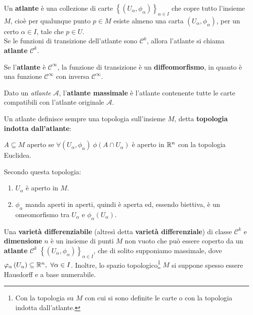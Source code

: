 \begin{define}[Atlante]
	Un \textbf{atlante} è una collezione di carte $\left\{\left(U_\alpha,\phi_\alpha\right)\right\}_{\alpha\in I}$ che copre tutto l'insieme $M$, cioè per qualunque punto $p\in M$ esiste almeno una carta $\left(U_\alpha,\phi_\alpha\right)$, per un certo $\alpha\in I$, tale che $p\in U$.\\
	Se le funzioni di transizione dell'atlante sono $\mathcal{C}^k$, allora l'atlante si chiama \textbf{atlante} $\mathcal{C}^k$.
\end{define}
Se l'\textbf{atlante} è $\mathcal{C}^\infty$, la funzione di transizione è un \textbf{diffeomorfismo}, in quanto è una funzione $\mathcal{C}^{\infty}$ con inversa $\mathcal{C}^{\infty}$.
\begin{define}
	Dato un \textit{atlante} $\mathcal{A}$, l'\textbf{atlante massimale} è l'atlante contenente tutte le carte compatibili con l'atlante originale $\mathcal{A}$.
\end{define}
\begin{define}
	Un atlante definisce sempre una topologia sull'insieme $M$, detta \textbf{topologia indotta dall'atlante}:
	\begin{center}
		$A\subseteq M$ aperto se $\forall \left(U_\alpha, \phi_\alpha\right)\ \phi\left(A\cap U_\alpha\right)$ è aperto in $\mathbb{R}^n$ con la topologia Euclidea.
	\end{center}
\end{define}
Secondo questa topologia:
\begin{enumerate}
	\item $U_\alpha$ è aperto in $M$.
	\item $\phi_\alpha$ manda aperti in aperti, quindi è aperta ed, essendo biettiva, è un omeomorfismo tra $U_\alpha$ e $\phi_\alpha\left(U_\alpha\right)$.
\end{enumerate}
\begin{define}
	Una \textbf{varietà differenziabile} (altresì detta \textbf{varietà differenziale}) di classe $\mathcal{C}^{k}$ e \textbf{dimensione} $n$ è un insieme di punti $M$ non vuoto che può essere coperto da un \textbf{atlante} $\mathcal{C}^{k}$ $\left\{\left(U_\alpha,\phi_\alpha\right)\right\}_{\alpha\in I}$, che di solito supponiamo massimale, dove $\varphi_\alpha\left(U_\alpha\right)\subseteq \mathbb{R}^n,\ \forall \alpha\in I$. Inoltre, lo spazio topologico\footnote{Con la topologia su $M$ con cui si sono definite le carte o con la topologia indotta dall'atlante.} $M$ si suppone spesso essere Hausdorff e a base numerabile.
\end{define}
